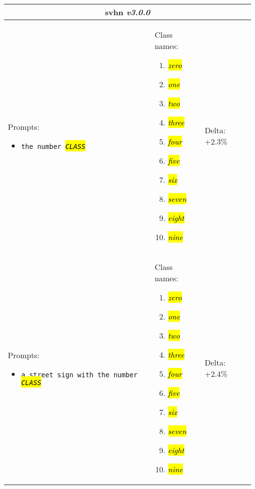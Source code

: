 \documentclass[10pt,twocolumn,letterpaper]{article}
\DeclareRobustCommand{\hlgrey}[1]{{\sethlcolor{light_gray}\hl{#1}}}
\newcommand{\clsfmt}[1]{\hlgrey{\textit{#1}}}
\def \cls {\clsfmt{CLASS}}
\begin{document}
\newpage
\onecolumn
\clearpage
{}
\begin{longtable}[h]{p{}p{}p{}}
\toprule
\multicolumn{3}{c}{\textbf{svhn} \emph{v3.0.0}} \\


\midrule


Prompts:
\small
\begin{itemize}[itemsep=1pt,topsep=1pt,leftmargin=12pt]
	\item \texttt{the number \cls~}
\end{itemize}
\normalsize &
Class names:

\small
\begin{enumerate}[itemsep=1pt,topsep=1pt,leftmargin=12pt]
	\item \clsfmt{zero}
	\item \clsfmt{one}
	\item \clsfmt{two}
	\item \clsfmt{three}
	\item \clsfmt{four}
	\item \clsfmt{five}
	\item \clsfmt{six}
	\item \clsfmt{seven}
	\item \clsfmt{eight}
	\item \clsfmt{nine}
\end{enumerate}
\normalsize
&
Delta: \small 
+2.3\%
\normalsize \\

\arrayrulecolor{black!30}\midrule


Prompts:
\small
\begin{itemize}[itemsep=1pt,topsep=1pt,leftmargin=12pt]
	\item \texttt{a street sign with the number \cls~}
\end{itemize}
\normalsize &
Class names:

\small
\begin{enumerate}[itemsep=1pt,topsep=1pt,leftmargin=12pt]
	\item \clsfmt{zero}
	\item \clsfmt{one}
	\item \clsfmt{two}
	\item \clsfmt{three}
	\item \clsfmt{four}
	\item \clsfmt{five}
	\item \clsfmt{six}
	\item \clsfmt{seven}
	\item \clsfmt{eight}
	\item \clsfmt{nine}
\end{enumerate}
\normalsize
&
Delta: \small 
+2.4\%
\normalsize \\


\end{longtable}
\end{document}
